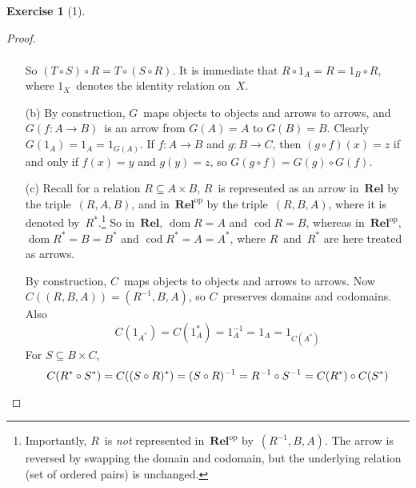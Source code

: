 \documentclass[letterpaper,12pt]{article}
\newcommand{\after}{\circ}
\DeclareMathOperator{\dom}{dom}
\DeclareMathOperator{\cod}{cod}
\newcommand{\inv}[1]{#1^{-1}}
\renewcommand{\star}[1]{#1^{*}}
\newcommand{\cat}[1]{\mathbf{#1}}
\newcommand{\dual}[1]{#1^{\mathrm{op}}}
\newcommand{\Rel}{\cat{Rel}}
\newcommand{\Relop}{\dual{\Rel}}
\theoremstyle{definition}
\newtheorem*{exer}{Exercise}
\theoremstyle{remark}
\theoremstyle{direction}
\begin{document}
\begin{exer}[1]
\begin{proof}
\begin{enumerate}[itemsep=0pt]
\begin{align*}
\end{align*}
So \((T\after S)\after R=T\after(S\after R)\). It is immediate that \(R\after 1_A=R=1_B\after R\), where \(1_X\)~denotes the identity relation on~\(X\).
\item[(b)] By construction, \(G\)~maps objects to objects and arrows to arrows, and \(G(f:A\to B)\)~is an arrow from \(G(A)=A\) to \(G(B)=B\). Clearly \(G(1_A)=1_A=1_{G(A)}\). If \(f:A\to B\) and \(g:B\to C\), then \((g\after f)(x)=z\) if and only if \(f(x)=y\) and \(g(y)=z\), so \(G(g\after f)=G(g)\after G(f)\).
\item[(c)] Recall for a relation \(R\subseteq A\times B\), \(R\)~is represented as an arrow in~\(\Rel\) by the triple~\((R,A,B)\), and in~\(\Relop\) by the triple~\((R,B,A)\), where it is denoted by~\(\star{R}\).\footnote{Importantly, \(R\)~is \emph{not} represented in~\(\Relop\) by~\((\inv{R},B,A)\). The arrow is reversed by swapping the domain and codomain, but the underlying relation (set of ordered pairs) is unchanged.} So in~\(\Rel\), \(\dom R=A\) and \(\cod R=B\), whereas in~\(\Relop\), \(\dom\star{R}=B=\star{B}\) and \(\cod\star{R}=A=\star{A}\), where \(R\)~and~\(\star{R}\) are here treated as arrows.

By construction, \(C\)~maps objects to objects and arrows to arrows. Now \(C((R,B,A))=(\inv{R},B,A)\), so \(C\)~preserves domains and codomains. Also
\[C(1_{\star{A}})=C(\star{1_A})=\inv{1_A}=1_A=1_{C(\star{A})}\]
For \(S\subseteq B\times C\),
\[C(\star{R}\after\star{S})=C(\star{(S\after R)})=\inv{(S\after R)}=\inv{R}\after\inv{S}=C(\star{R})\after C(\star{S})\qedhere\]
\end{enumerate}
\end{proof}
\end{exer}
\end{document}
